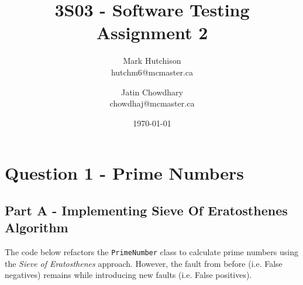 \documentclass{article}
\title{3S03 - Software Testing \\
Assignment 2}
\author{Mark Hutchison \\
hutchm6@mcmaster.ca \and
Jatin Chowdhary \\
chowdhaj@mcmaster.ca}
\date{\today}
\begin{document}
\maketitle

\tableofcontents

\section*{Question 1 - Prime Numbers}

\subsection*{Part A - Implementing Sieve Of Eratosthenes Algorithm}

The code below refactors the \texttt{PrimeNumber} class to calculate prime numbers using the \textit{Sieve of Eratosthenes} approach. However, the fault from before (i.e. False negatives) remains while introducing new faults (i.e. False positives).
\end{document}
